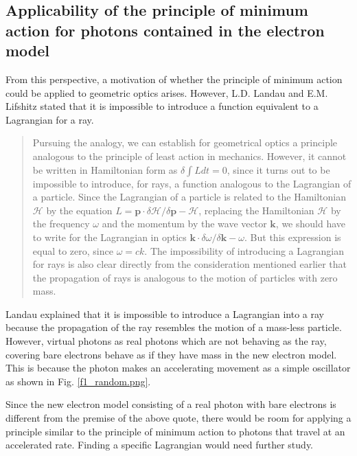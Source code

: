 \documentclass[reprint,amsmath,amssymb,aps,]{revtex4-1}
\numberwithin{equation}{section}%
\begin{document}
\subsection{
    \label{sec:}Applicability of the principle of minimum action for photons contained in the electron model}
    

    From this perspective, a motivation of whether the principle of minimum action could be applied to geometric optics arises. However, L.D. Landau and E.M. Lifshitz stated that it is impossible to introduce a function equivalent to a Lagrangian for a ray.
    
    
    \begin{quote}
        Pursuing the analogy, we can establish for geometrical optics a principle analogous to the principle of least action in mechanics. However, it cannot be written in Hamiltonian form as $\delta \int L dt = 0$, since it turns out to be impossible to introduce, for rays, a function analogous to the Lagrangian of a particle. Since the Lagrangian of a particle is related to the Hamiltonian $\mathcal{H}$ by the equation $L = \bm{p} \cdot \delta \mathcal{H} / \delta \bm{p} - \mathcal{H}$, replacing the Hamiltonian $\mathcal{H}$ by the frequency $\omega$ and the momentum by the wave vector $\bm{k}$, we should have to write for the Lagrangian in optics $\bm{k} \cdot \delta \omega / \delta \bm{k}- \omega$. But this expression is equal to zero, since $\omega = c k$. The impossibility of introducing a Lagrangian for rays is also clear directly from the consideration mentioned earlier that the propagation of rays is analogous to the motion of particles with zero mass. \cite{Landau}
    \end{quote}

    Landau explained that it is impossible to introduce a Lagrangian into a ray because the propagation of the ray resembles the motion of a mass-less particle. However, virtual photons as real photons which are not behaving as the ray, covering bare electrons behave as if they have mass in the new electron model. This is because the photon makes an accelerating movement as a simple oscillator as shown in Fig. \ref{f1_random.png}.
    

    Since the new electron model consisting of a real photon with bare electrons is different from the premise of the above quote, there would be room for applying a principle similar to the principle of minimum action to photons that travel at an accelerated rate. Finding a specific Lagrangian would need further study.
    
\end{document}

